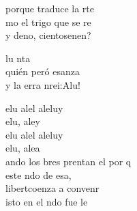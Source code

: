 \documentclass[12pt]{article}
\begin{document}
\begin{multicols*}{2}
\begin{cancion}
	porque traduce la rte\\
	mo el trigo que se re \\
	y deno, cientosenen?\\
	\begin{chorus}%
	lu nta \\
	quién peró esanza\\
	y la erra nrei:Alu!\\
	\end{chorus}%
\end{cancion}%

\begin{cancion}%
	elu  alel aleluy\\
	elu, aley\\
	elu  alel aleluy\\
	elu, alea\\
	ando los bres prentan el por q \\
	 este ndo de esa,\\
	 libertcoenza a convenr\\
	isto en el ndo fue le\\
\end{cancion}%


\end{multicols*}
\end{document}
